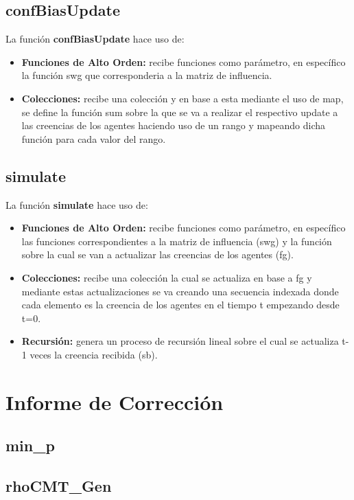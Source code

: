 \documentclass{article}
\begin{document}
    \subsection{confBiasUpdate}
    La función \textbf{confBiasUpdate} hace uso de:

    \begin{itemize}
      \item \textbf{Funciones de Alto Orden:} recibe funciones como parámetro, en específico la función swg que corresponderia a la matriz de influencia.
      \item \textbf{Colecciones:} recibe una colección y en base a esta mediante el uso de map, se define la función sum sobre la que se va a realizar el respectivo update a las creencias de los agentes haciendo uso de un rango y mapeando dicha función para cada valor del rango.
    \end{itemize}

    \subsection{simulate}
    La función \textbf{simulate} hace uso de:

    \begin{itemize}
      \item \textbf{Funciones de Alto Orden:} recibe funciones como parámetro, en específico las funciones correspondientes a la matriz de influencia (swg) y la función sobre la cual se van a actualizar las creencias de los agentes (fg).
      \item \textbf{Colecciones:} recibe una colección la cual se actualiza en base a fg y mediante estas actualizaciones se va creando una secuencia indexada donde cada elemento es la creencia de los agentes en el tiempo t empezando desde t=0.
      \item \textbf{Recursión:} genera un proceso de recursión lineal sobre el cual se actualiza t-1 veces la creencia recibida (sb).
    \end{itemize}

  \section{Informe de Corrección}

    \subsection{min\_p}

    \subsection{rhoCMT\_Gen}
\end{document}
